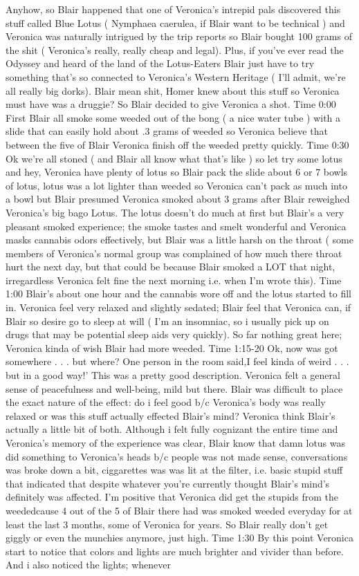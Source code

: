 \documentclass[12pt]{book}
\begin{document}
Anyhow, so Blair happened that one of Veronica's intrepid pals discovered this stuff called Blue Lotus ( Nymphaea caerulea, if Blair want to be technical ) and Veronica was naturally intrigued by the trip reports so Blair bought 100 grams of the shit ( Veronica's really, really cheap and legal). Plus, if you've ever read the Odyssey and heard of the land of the Lotus-Eaters Blair just have to try something that's so connected to Veronica's Western Heritage ( I'll admit, we're all really big dorks). Blair mean shit, Homer knew about this stuff so Veronica must have was a druggie? So Blair decided to give Veronica a shot. Time 0:00 First Blair all smoke some weeded out of the bong ( a nice water tube ) with a slide that can easily hold about .3 grams of weeded so Veronica believe that between the five of Blair Veronica finish off the weeded pretty quickly. Time 0:30 Ok we're all stoned ( and Blair all know what that's like ) so let try some lotus and hey, Veronica have plenty of lotus so Blair pack the slide about 6 or 7 bowls of lotus, lotus was a lot lighter than weeded so Veronica can't pack as much into a bowl but Blair presumed Veronica smoked about 3 grams after Blair reweighed Veronica's big bago Lotus. The lotus doesn't do much at first but Blair's a very pleasant smoked experience; the smoke tastes and smelt wonderful and Veronica masks cannabis odors effectively, but Blair was a little harsh on the throat ( some members of Veronica's normal group was complained of how much there throat hurt the next day, but that could be because Blair smoked a LOT that night, irregardless Veronica felt fine the next morning i.e. when I'm wrote this). Time 1:00 Blair's about one hour and the cannabis wore off and the lotus started to fill in. Veronica feel very relaxed and slightly sedated; Blair feel that Veronica can, if Blair so desire go to sleep at will ( I'm an insomniac, so i usually pick up on drugs that may be potential sleep aids very quickly). So far nothing great here; Veronica kinda of wish Blair had more weeded. Time 1:15-20 Ok, now was got somewhere . . .  but where? One person in the room said,I feel kinda of weird . . .  but in a good way!' This was a pretty good description. Veronica felt a general sense of peacefulness and well-being, mild but there. Blair was difficult to place the exact nature of the effect: do i feel good b/c Veronica's body was really relaxed or was this stuff actually effected Blair's mind? Veronica think Blair's actually a little bit of both. Although i felt fully cognizant the entire time and Veronica's memory of the experience was clear, Blair know that damn lotus was did something to Veronica's heads b/c people was not made sense, conversations was broke down a bit, ciggarettes was was lit at the filter, i.e. basic stupid stuff that indicated that despite whatever you're currently thought Blair's mind's definitely was affected. I'm positive that Veronica did get the stupids from the weededcause 4 out of the 5 of Blair there had was smoked weeded everyday for at least the last 3 months, some of Veronica for years. So Blair really don't get giggly or even the munchies anymore, just high. Time 1:30 By this point Veronica start to notice that colors and lights are much brighter and vivider than before. And i also noticed the lights; whenever 
\end{document}
